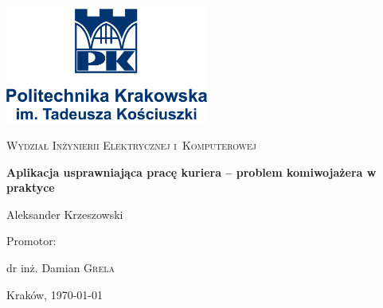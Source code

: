 \begin{titlepage}
	\begin{adjustwidth*}{-2cm}{-2cm}
		\centering
	\includegraphics[width=0.5\textwidth]{pk.png}\par
	\vspace{0.5cm}
	{\scshape Wydział Inżynierii Elektrycznej i~Komputerowej\par}
	\vspace{2cm}
	
	{\huge\bfseries Aplikacja usprawniająca pracę kuriera -- problem komiwojażera w praktyce\par}
	
	\vspace{0.5cm}
	{\Large Aleksander Krzeszowski\par}
	\vfill
	Promotor:\par
	dr inż. Damian \textsc{Grela}
	\vfill

	{\large Kraków, \today\par}
	\end{adjustwidth*}
\end{titlepage}
